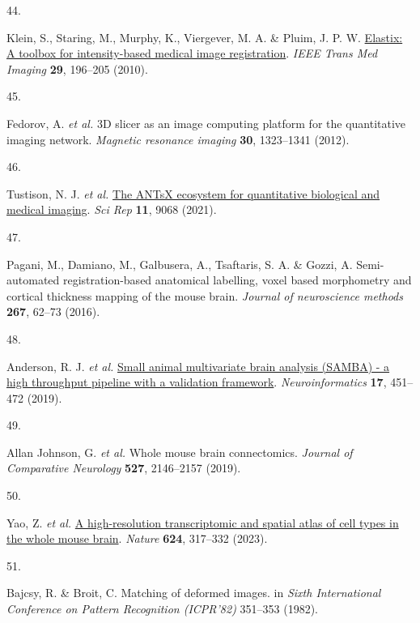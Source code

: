 \documentclass[
  12pt,
]{article}
\newlength{\cslhangindent}
\newlength{\csllabelwidth}
\newenvironment{CSLReferences}[2] %
 {\begin{list}{}{%
  \setlength{\itemindent}{0pt}
  \setlength{\leftmargin}{0pt}
  \setlength{\parsep}{0pt}
  \ifodd #1
   \setlength{\leftmargin}{\cslhangindent}
   \setlength{\itemindent}{-1\cslhangindent}
  \fi
  \setlength{\itemsep}{#2\baselineskip}}}
 {\end{list}}
\newcommand{\CSLLeftMargin}[1]{\parbox[t]{\csllabelwidth}{\strut#1\strut}}
\newcommand{\CSLRightInline}[1]{\parbox[t]{\linewidth - \csllabelwidth}{\strut#1\strut}}
\begin{document}
\begin{CSLReferences}{0}{0}
\CSLLeftMargin{44. }%
\CSLRightInline{Klein, S., Staring, M., Murphy, K., Viergever, M. A. \&
Pluim, J. P. W. \href{https://doi.org/10.1109/TMI.2009.2035616}{Elastix:
A toolbox for intensity-based medical image registration}. \emph{IEEE
Trans Med Imaging} \textbf{29}, 196--205 (2010).}

\CSLLeftMargin{45. }%
\CSLRightInline{Fedorov, A. \emph{et al.} 3D slicer as an image
computing platform for the quantitative imaging network. \emph{Magnetic
resonance imaging} \textbf{30}, 1323--1341 (2012).}

\CSLLeftMargin{46. }%
\CSLRightInline{Tustison, N. J. \emph{et al.}
\href{https://doi.org/10.1038/s41598-021-87564-6}{The ANTsX ecosystem
for quantitative biological and medical imaging}. \emph{Sci Rep}
\textbf{11}, 9068 (2021).}

\CSLLeftMargin{47. }%
\CSLRightInline{Pagani, M., Damiano, M., Galbusera, A., Tsaftaris, S. A.
\& Gozzi, A. Semi-automated registration-based anatomical labelling,
voxel based morphometry and cortical thickness mapping of the mouse
brain. \emph{Journal of neuroscience methods} \textbf{267}, 62--73
(2016).}

\CSLLeftMargin{48. }%
\CSLRightInline{Anderson, R. J. \emph{et al.}
\href{https://doi.org/10.1007/s12021-018-9410-0}{Small animal
multivariate brain analysis (SAMBA) - a high throughput pipeline with a
validation framework}. \emph{Neuroinformatics} \textbf{17}, 451--472
(2019).}

\CSLLeftMargin{49. }%
\CSLRightInline{Allan Johnson, G. \emph{et al.} Whole mouse brain
connectomics. \emph{Journal of Comparative Neurology} \textbf{527},
2146--2157 (2019).}

\CSLLeftMargin{50. }%
\CSLRightInline{Yao, Z. \emph{et al.}
\href{https://doi.org/10.1038/s41586-023-06812-z}{A high-resolution
transcriptomic and spatial atlas of cell types in the whole mouse
brain}. \emph{Nature} \textbf{624}, 317--332 (2023).}

\CSLLeftMargin{51. }%
\CSLRightInline{Bajcsy, R. \& Broit, C. Matching of deformed images. in
\emph{{S}ixth {I}nternational {C}onference on {P}attern {R}ecognition
({ICPR}'82)} 351--353 (1982).}


\end{CSLReferences}
\end{document}
